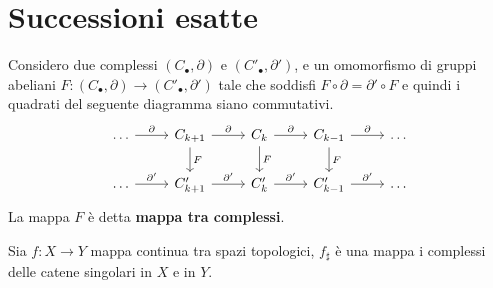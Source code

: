 \section{Successioni esatte}


\begin{definition}
  Considero due complessi $ (C_\bullet, \partial) $ e $ (C'_\bullet, \partial') $, e un omomorfismo di
  gruppi abeliani $ F \colon (C_\bullet, \partial) \to (C'_\bullet, \partial') $ tale che soddisfi
  $ F \circ \partial = \partial' \circ F $ e quindi i quadrati del seguente diagramma siano commutativi.
  \[
    \begin{tikzcd}
      \dots \arrow{r}{\partial} &  C_{k+1}  \arrow{r}{\partial} \arrow{d}{F} &  C_{k}  \arrow{r}{\partial} \arrow{d}{F} & C_{k-1}  \arrow{r}{\partial} \arrow{d}{F} & \dots \\
      \dots \arrow{r}{\partial'} &  C'_{k+1}  \arrow{r}{\partial'} &  C'_{k}  \arrow{r}{\partial'}  &  C'_{k-1} \arrow{r}{\partial'} & \dots
    \end{tikzcd}
  \]
  La mappa $ F $ è detta \textbf{mappa tra complessi}.
\end{definition}
\begin{example}
  Sia $ f \colon X \to Y $ mappa continua tra spazi topologici, $ f_\sharp $ è una
  mappa i complessi delle catene singolari in $ X $ e in $ Y $.
\end{example}



